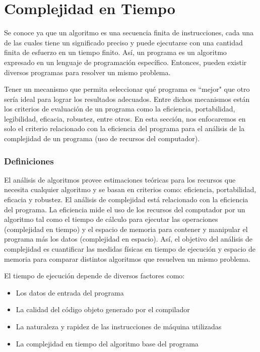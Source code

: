 \newpage
\part{Complejidad en Tiempo}
\setcounter{section}{0}

Se conoce ya que un algoritmo es una secuencia finita de instrucciones, cada una de las cuales tiene un significado preciso y puede ejecutarse con una cantidad finita de esfuerzo en un tiempo finito. Así, un programa es un algoritmo expresado en un lenguaje de programación específico. Entonces, pueden existir diversos programas para resolver un mismo problema. 

Tener un mecanismo que permita seleccionar qué programa es ``mejor" que otro sería ideal para lograr los resultados adecuados. Entre dichos mecanismos están los criterios de evaluación de un programa como la eficiencia, portabilidad, legibilidad, eficacia, robustez, entre otros. En esta sección, nos enfocaremos en solo el criterio relacionado con la eficiencia del programa para el análisis de la complejidad de un programa (uso de recursos del computador).


\section{Definiciones}

El análisis de algoritmos provee estimaciones teóricas para los recursos que necesita cualquier algoritmo y se basan en criterios como: eficiencia, portabilidad, eficacia y robustez. El análisis de complejidad está relacionado con la eficiencia del programa. La eficiencia mide el uso de los recursos del computador por un algoritmo tal como el tiempo de cálculo para ejecutar las operaciones (complejidad en tiempo) y el espacio de memoria para contener y manipular el programa más los datos (complejidad en espacio). Así, el objetivo del análisis de complejidad es cuantificar las medidas físicas en  tiempo de ejecución y espacio de memoria para comparar distintos algoritmos que resuelven un mismo problema.

El tiempo de ejecución depende de diversos factores como:
\begin{itemize}
\item Los datos de entrada del programa
\item La calidad del código objeto generado por el compilador
\item La naturaleza y rapidez de las instrucciones de máquina utilizadas
\item La complejidad en tiempo del algoritmo base del programa
\end{itemize}

